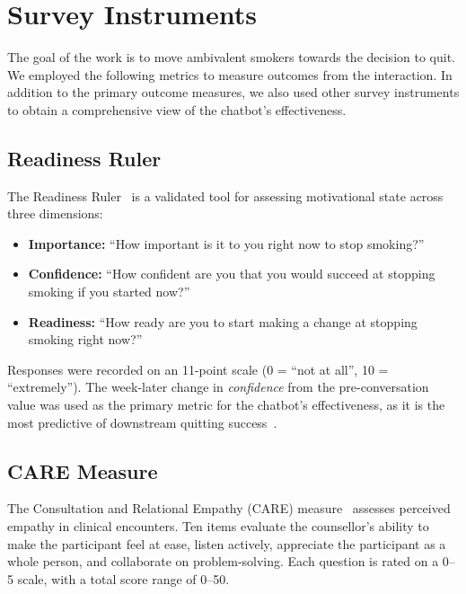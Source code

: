 \section{Survey Instruments}
\label{subsec:survey-instruments}

The goal of the work is to move ambivalent smokers towards the decision to quit. We employed the following metrics to measure outcomes from the interaction. In addition to the primary outcome measures, we also used other survey instruments to obtain a comprehensive view of the chatbot's effectiveness.

\subsection{Readiness Ruler}
\label{subsec:readiness-ruler}
The Readiness Ruler~\citep{rollnick1992development} is a validated tool for assessing motivational state across three dimensions:
\begin{itemize}
    \item \textbf{Importance:} ``How important is it to you right now to stop smoking?''
    \item \textbf{Confidence:} ``How confident are you that you would succeed at stopping smoking if you started now?''
    \item \textbf{Readiness:} ``How ready are you to start making a change at stopping smoking right now?''
\end{itemize}
Responses were recorded on an 11-point scale (0 = ``not at all'', 10 = ``extremely''). The week-later change in \emph{confidence} from the pre-conversation value was used as the primary metric for the chatbot's effectiveness, as it is the most predictive of downstream quitting success~\citep{Gwaltney2009-wj,Abar2013}.

\subsection{CARE Measure}
\label{subsec:care}
The Consultation and Relational Empathy (CARE) measure~\citep{10.1093/fampra/cmh621,Bikker2015} assesses perceived empathy in clinical encounters. Ten items evaluate the counsellor's ability to make the participant feel at ease, listen actively, appreciate the participant as a whole person, and collaborate on problem-solving. Each question is rated on a 0--5 scale, with a total score range of 0--50.

